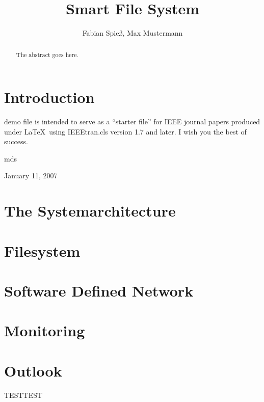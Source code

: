 \documentclass[journal]{IEEEtran}
\begin{document}
\title{Smart File System}

\author{Fabian Spie\ss, Max Mustermann}
        
\maketitle


\begin{abstract}
The abstract goes here.
\end{abstract}

\IEEEpeerreviewmaketitle

\tableofcontents


\section{Introduction}
 demo file is intended to serve as a ``starter file''
for IEEE journal papers produced under \LaTeX\ using
IEEEtran.cls version 1.7 and later.
I wish you the best of success.

\hfill mds
 
\hfill January 11, 2007

\section{The Systemarchitecture}



\section{Filesystem}


\section{Software Defined Network}


\section{Monitoring}




\section{Outlook}

TESTTEST
\end{document}
